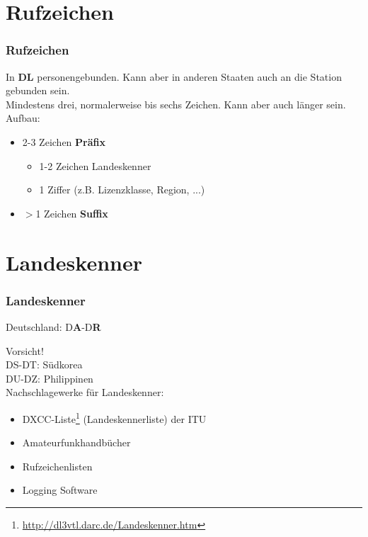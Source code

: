 \section{Rufzeichen}

\begin{frame}
    \frametitle{Rufzeichen}

    In \textbf{DL} personengebunden. Kann aber in anderen Staaten auch an die Station
    gebunden sein. \\[1em]

    Mindestens drei, normalerweise bis sechs Zeichen. Kann aber auch länger
    sein.\\[1em]
    
    Aufbau:

    \begin{itemize}
        \item 2-3 Zeichen \textbf{Präfix}
        \begin{itemize}
            \item 1-2 Zeichen Landeskenner
            \item 1 Ziffer (z.B. Lizenzklasse, Region, ...)
        \end{itemize}
        \item $>$1 Zeichen \textbf{Suffix}
    \end{itemize}

\end{frame}

\section{Landeskenner}

\begin{frame}
    \frametitle{Landeskenner}

    \begin{center}
        Deutschland: D\textbf{A}-D\textbf{R} \\[1em]
    \end{center}

    Vorsicht! \\
    DS-DT: Südkorea \\
    DU-DZ: Philippinen \\[2em]

    Nachschlagewerke für Landeskenner:

    \begin{itemize}
        \item DXCC-Liste\footnote{\url{http://dl3vtl.darc.de/Landeskenner.htm}}
              (Landeskennerliste) der ITU
        \item Amateurfunkhandbücher
        \item Rufzeichenlisten
        \item Logging Software
    \end{itemize}

\end{frame}

